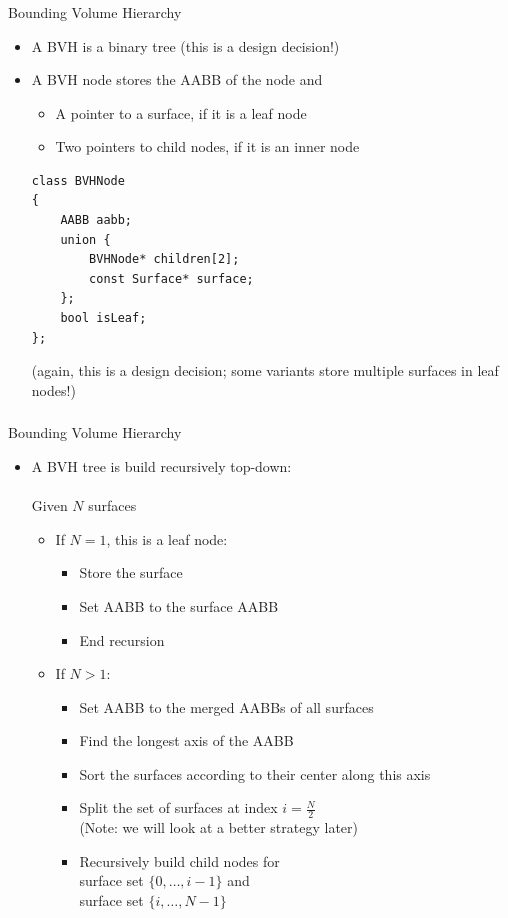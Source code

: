 \documentclass[utf8,stillsansserifmath,fleqn,t]{beamer}
\begin{document}
\begin{frame}[fragile]
\frametitle{\insertsection}
Bounding Volume Hierarchy
\begin{itemize}
\item A BVH is a binary tree (this is a design decision!)
\item A BVH node stores the AABB of the node and
    \begin{itemize}
    \item A pointer to a surface, if it is a leaf node
    \item Two pointers to child nodes, if it is an inner node
    \end{itemize}
\begin{lstlisting}
class BVHNode
{
    AABB aabb;
    union {
        BVHNode* children[2];
        const Surface* surface;
    };
    bool isLeaf;
};
\end{lstlisting}
    (again, this is a design decision; some variants store multiple surfaces in leaf nodes!)
\end{itemize}
\end{frame}

\begin{frame}[label=bvh]
\frametitle{\insertsection}
Bounding Volume Hierarchy
\begin{itemize}
\item A BVH tree is build recursively top-down:\\~\\
    Given $N$ surfaces
    \begin{itemize}
    \item If $N=1$, this is a leaf node:
        \begin{itemize}
        \item Store the surface
        \item Set AABB to the surface AABB
        \item End recursion
        \end{itemize}
    \item If $N>1$:
        \begin{itemize}
        \item Set AABB to the merged AABBs of all surfaces
        \item Find the longest axis of the AABB
        \item Sort the surfaces according to their center along this axis
        \item Split the set of surfaces at index $i = \frac{N}{2}$\\
            (Note: we will look at a better strategy later)
        \item Recursively build child nodes for\\
             surface set $\{0,\ldots{},i-1\}$ and\\
             surface set $\{i,\ldots{},N-1\}$
        \end{itemize}
    \end{itemize}
\end{itemize}
\end{frame}
\end{document}
